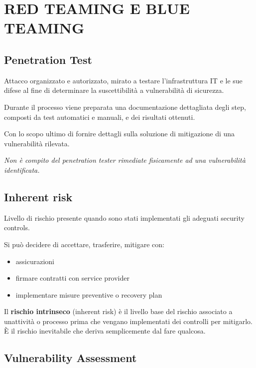 \section{RED TEAMING E BLUE TEAMING}\label{red-teaming-e-blue-teaming}

\subsection{Penetration Test}\label{penetration-test}

Attacco organizzato e autorizzato, mirato a testare l'infrastruttura IT
e le sue difese al fine di determinare la suscettibilità a vulnerabilità
di sicurezza.

Durante il processo viene preparata una documentazione dettagliata degli
step, composti da test automatici e manuali, e dei risultati ottenuti.

Con lo scopo ultimo di fornire dettagli sulla soluzione di mitigazione
di una vulnerabilità rilevata.

\emph{Non è compito del penetration tester rimediate fisicamente ad una
vulnerabilità identificata.}

\subsection{Inherent risk}\label{inherent-risk}

Livello di rischio presente quando sono stati implementati gli adeguati
security controls.

Si può decidere di accettare, trasferire, mitigare con:

\begin{itemize}
\item
  assicurazioni
\item
  firmare contratti con service provider
\item
  implementare misure preventive o recovery plan
\end{itemize}

Il \textbf{rischio intrinseco} (inherent risk) è il livello base del
rischio associato a un\textquotesingle attività o processo prima che
vengano implementati dei controlli per mitigarlo. È il rischio
inevitabile che deriva semplicemente dal fare qualcosa.

\subsection{Vulnerability Assessment}\label{vulnerability-assessment}

